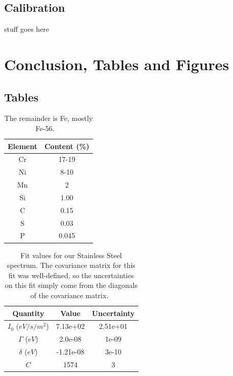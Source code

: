 \documentclass[reprint, nobibnotes, amssymb, amsmath, amsfonts, mathtools, mathrsfs, floatfix]{revtex4-1}
\begin{document}
      \subsection{Calibration}
        stuff goes here



  \section{Conclusion, Tables and Figures}

    \subsection{Tables}
      \begin{table}[h]
        \centering
        \begin{tabular}{|c|c|}
          \hline
          Element & Content (\%) \\ \hline
          Cr & 17-19 \\ \hline
          Ni & 8-10 \\ \hline
          Mn & 2 \\ \hline
          Si & 1.00 \\ \hline
          C & 0.15 \\ \hline
          S & 0.03 \\ \hline
          P & 0.045 \\ \hline
        \end{tabular}
        \caption{The remainder is Fe, mostly Fe-56.~\cite{stainless_chemical_makeup}~\label{tab:SS_chemical_makeup}}
      \end{table}

      \begin{table}[h]
        \centering
        \begin{tabular}{|c|c|c|}
          \hline
          Quantity & Value & Uncertainty \\ \hline \hline
          $I_0$ ($eV/s/m^2$) & 7.13e+02 & 2.51e+01 \\ \hline \hline
          $\Gamma$ ($eV$) & 2.0e-08 & 1e-09 \\ \hline \hline
          $\delta$ ($eV$) & -1.21e-08 & 3e-10 \\ \hline \hline
          $C$ & 1574 & 3 \\ \hline
        \end{tabular}
        \caption{Fit values for our Stainless Steel spectrum.  The covariance matrix for this fit was well-defined, so the uncertainties on this fit simply come from the diagonals of the covariance matrix.~\label{tab:ss_fit_stats}}
      \end{table}
\end{document}

